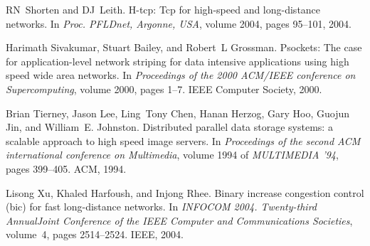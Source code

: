 \documentclass[a4paper, conference]{IEEEtran}
\begin{document}
\begin{thebibliography}{10}
RN~Shorten and DJ~Leith.
\newblock H-tcp: Tcp for high-speed and long-distance networks.
\newblock In {\em Proc. PFLDnet, Argonne, USA}, volume 2004, pages 95--101,
  2004.

Harimath Sivakumar, Stuart Bailey, and Robert~L Grossman.
\newblock Psockets: The case for application-level network striping for data
  intensive applications using high speed wide area networks.
\newblock In {\em Proceedings of the 2000 ACM/IEEE conference on
  Supercomputing}, volume 2000, pages 1--7. IEEE Computer Society, 2000.

Brian Tierney, Jason Lee, Ling~Tony Chen, Hanan Herzog, Gary Hoo, Guojun Jin,
  and William~E. Johnston.
\newblock Distributed parallel data storage systems: a scalable approach to
  high speed image servers.
\newblock In {\em Proceedings of the second ACM international conference on
  Multimedia}, volume 1994 of {\em MULTIMEDIA '94}, pages 399--405. ACM, 1994.

Lisong Xu, Khaled Harfoush, and Injong Rhee.
\newblock Binary increase congestion control (bic) for fast long-distance
  networks.
\newblock In {\em INFOCOM 2004. Twenty-third AnnualJoint Conference of the IEEE
  Computer and Communications Societies}, volume~4, pages 2514--2524. IEEE,
  2004.

\end{thebibliography}


\endgroup
\end{document}
